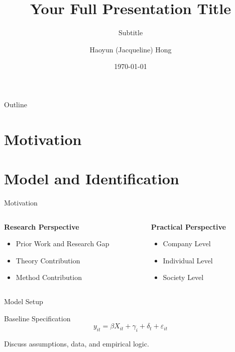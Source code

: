 \documentclass[aspectratio=169,11pt]{beamer}
\title[\href{mailto:hh3863@stern.nyu.edu}{hh3863@stern.nyu.edu}]{Your Full Presentation Title}
\subtitle{\Large Subtitle}
\author{\large Haoyun (Jacqueline) Hong}
\institute{\small Information Systems, NYU Stern School of Business}
\date{\small \today}
\begin{document}
\begin{frame}[plain]
  \titlepage
\end{frame}

\begin{frame}{Outline}
  \tableofcontents
\end{frame}

\section{Motivation}
\section{Model and Identification}

\begin{frame}{Motivation}
\begin{columns}[T]
  \begin{column}{0.48\textwidth}
    \textbf{Research Perspective}
    \vspace{0.3em}
    \begin{itemize}\setlength{\itemsep}{0.6em}
      \item Prior Work and Research Gap 
      \item Theory Contribution
      \item Method Contribution
    \end{itemize}
  \end{column}

  \begin{column}{0.48\textwidth}
    \textbf{Practical Perspective}
    \vspace{0.3em}
    \begin{itemize}\setlength{\itemsep}{0.6em}
      \item Company Level
      \item Individual Level 
      \item Society Level
    \end{itemize}
  \end{column}
\end{columns}
\end{frame}

\begin{frame}{Model Setup}
  \begin{block}{Baseline Specification}
    \[
      y_{it} = \beta X_{it} + \gamma_i + \delta_t + \varepsilon_{it}
    \]
  \end{block}
  Discuss assumptions, data, and empirical logic.
\end{frame}
\end{document}
